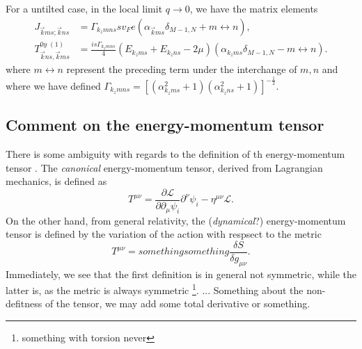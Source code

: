 \begin{summary}
  For a untilted case, in the local limit \( q\to 0 \), we have the matrix elements
  \begin{align}
    J_{\vec{k} ms; \vec{k} ns}&=
                                \Gamma_{k_z m n s}
                                sv_F e
                                \left(
                                \alpha_{\vec{k} m s} \delta _{M-1, N}
                                + m\leftrightarrow n
                                \right),\\
    T^{0y\; (1)}_{\vec{k} ns, \vec{k}ms} &=
                                           \frac{is \Gamma_{k_z m n s}}{4}
                                           \left(E_{k_z m s} + E_{k_z n s}- 2\mu \right)
                                           \left(
                                           \alpha_{k_z m s} \delta_{M-1, N}
                                           -
                                           m\leftrightarrow n
                                           \right).
  \end{align}
where \( m \leftrightarrow n \) represent the preceding term under the interchange of \( m, n \) and where we have defined
$
\Gamma_{k_z m n s} =
\left[(\alpha _{k_zm s}^2 + 1) (\alpha _{k_z n s}^2 + 1) \right]^{-\frac{1}{2}}
$.
\end{summary}

\subsection{Comment on the energy-momentum tensor}
There is some ambiguity with regards to the definition of th energy-momentum tensor .
The \emph{canonical} energy-momentum tensor, derived from Lagrangian mechanics, is defined as
\begin{equation}
	T^{\mu \nu } = \frac{\partial \mathcal{L}}{\partial \partial _{\mu } \psi_i } \partial ^{\nu } \psi_i - \eta^{\mu \nu } \mathcal{L}.
\end{equation}
On the other hand, from general relativity, the (\emph{dynamical}?) energy-momentum tensor is defined by the variation of the action with respsect to the metric
\begin{equation}
	T^{\mu \nu} = something something \frac{\delta S}{\delta g_{\mu \nu}}.
\end{equation}
Immediately, we see that the first definition is in general not symmetric, while the latter is, as the metric is always symmetric \footnote{something with torsion never}.
...
Something about the non-defitness of the tensor, we may add some total derivative or something.

